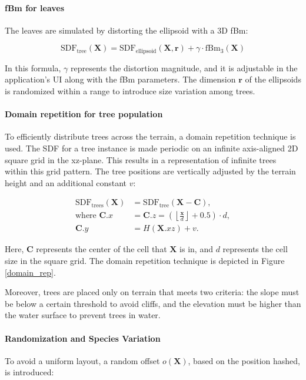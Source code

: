 \paragraph{fBm for leaves}
The leaves are simulated by distorting the ellipsoid with a 3D fBm:

\begin{equation}
\text{SDF}_\text{tree}(\mathbf{X}) = \text{SDF}_\text{ellipsoid}(\mathbf{X}, \mathbf{r}) + \gamma \cdot \text{fBm}_3(\mathbf{X})
\end{equation}

In this formula, $\gamma$ represents the distortion magnitude, and it is adjustable in the application's UI along with the fBm parameters. The dimension $\mathbf{r}$ of the ellipsoids is randomized within a range to introduce size variation among trees.

\paragraph{Domain repetition for tree population}
To efficiently distribute trees across the terrain, a domain repetition technique is used. The SDF for a tree instance is made periodic on an infinite axis-aligned 2D square grid in the xz-plane. This results in a representation of infinite trees within this grid pattern. The tree positions are vertically adjusted by the terrain height and an additional constant $v$:

\begin{equation}
\begin{aligned}
\text{SDF}_\text{trees}(\mathbf{X}) &= \text{SDF}_\text{tree}(\mathbf{X} - \mathbf{C}), \\
\text{where } \mathbf{C}.x &= \mathbf{C}.z = \left(\left\lfloor \frac{\mathbf{x}}{d} \right\rfloor + 0.5\right) \cdot d, \\
\mathbf{C}.y &= H(\mathbf{X}.{xz}) + v.
\end{aligned}
\end{equation}

Here, $\mathbf{C}$ represents the center of the cell that $\mathbf{X}$ is in, and $d$ represents the cell size in the square grid. The domain repetition technique is depicted in Figure \ref{domain_rep}.

Moreover, trees are placed only on terrain that meets two criteria: the slope must be below a certain threshold to avoid cliffs, and the elevation must be higher than the water surface to prevent trees in water.

\paragraph{Randomization and Species Variation}
To avoid a uniform layout, a random offset $o(\mathbf{X})$, based on the position hashed, is introduced:

